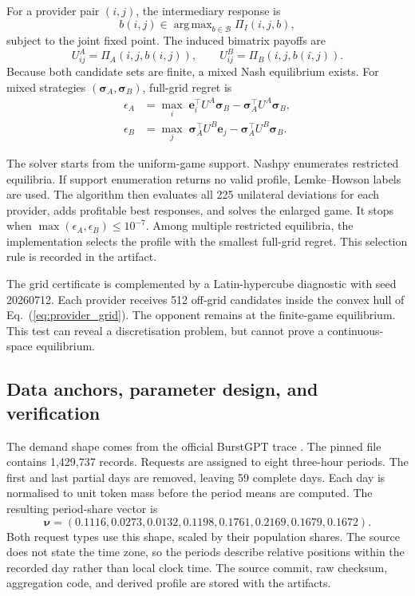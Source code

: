 \documentclass[11pt,a4paper]{article}
\DeclareMathOperator*{\argmax}{arg\,max}
\begin{document}
For a provider pair $(i,j)$, the intermediary response is
\begin{equation}
b(i,j)\in\argmax_{b\in\mathcal B}\Pi_I(i,j,b),
\label{eq:intermediary_br}
\end{equation}
subject to the joint fixed point. The induced bimatrix payoffs are
\begin{equation}
U^A_{ij}=\Pi_A(i,j,b(i,j)),
\qquad
U^B_{ij}=\Pi_B(i,j,b(i,j)).
\label{eq:bimatrix}
\end{equation}
Because both candidate sets are finite, a mixed Nash equilibrium exists. For mixed strategies $(\boldsymbol\sigma_A,\boldsymbol\sigma_B)$, full-grid regret is
\begin{align}
\epsilon_A&=\max_i\;\boldsymbol e_i^\top U^A\boldsymbol\sigma_B
-\boldsymbol\sigma_A^\top U^A\boldsymbol\sigma_B,\label{eq:row_regret}\\
\epsilon_B&=\max_j\;\boldsymbol\sigma_A^\top U^B\boldsymbol e_j
-\boldsymbol\sigma_A^\top U^B\boldsymbol\sigma_B.\label{eq:col_regret}
\end{align}

The solver starts from the uniform-game support. Nashpy enumerates restricted equilibria. If support enumeration returns no valid profile, Lemke--Howson labels are used. The algorithm then evaluates all 225 unilateral deviations for each provider, adds profitable best responses, and solves the enlarged game. It stops when $\max(\epsilon_A,\epsilon_B)\le10^{-7}$. Among multiple restricted equilibria, the implementation selects the profile with the smallest full-grid regret. This selection rule is recorded in the artifact.

The grid certificate is complemented by a Latin-hypercube diagnostic with seed 20260712. Each provider receives 512 off-grid candidates inside the convex hull of Eq.~(\ref{eq:provider_grid}). The opponent remains at the finite-game equilibrium. This test can reveal a discretisation problem, but cannot prove a continuous-space equilibrium.

\subsection{Data anchors, parameter design, and verification}

The demand shape comes from the official BurstGPT trace \cite{wang2025burstgpt}. The pinned file contains 1,429,737 records. Requests are assigned to eight three-hour periods. The first and last partial days are removed, leaving 59 complete days. Each day is normalised to unit token mass before the period means are computed. The resulting period-share vector is
\[
\boldsymbol\nu=(0.1116,0.0273,0.0132,0.1198,0.1761,0.2169,0.1679,0.1672).
\]
Both request types use this shape, scaled by their population shares. The source does not state the time zone, so the periods describe relative positions within the recorded day rather than local clock time. The source commit, raw checksum, aggregation code, and derived profile are stored with the artifacts.
\end{document}

